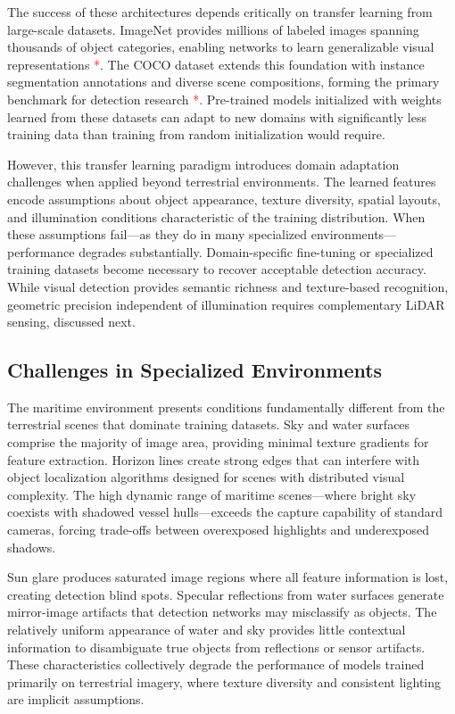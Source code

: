 \documentclass[../main.tex]{subfiles}
\begin{document}
The success of these architectures depends critically on transfer learning from large-scale datasets. ImageNet provides millions of labeled images spanning thousands of object categories, enabling networks to learn generalizable visual representations \textcolor{red}{*}. The COCO dataset extends this foundation with instance segmentation annotations and diverse scene compositions, forming the primary benchmark for detection research \textcolor{red}{*}. Pre-trained models initialized with weights learned from these datasets can adapt to new domains with significantly less training data than training from random initialization would require.

However, this transfer learning paradigm introduces domain adaptation challenges when applied beyond terrestrial environments. The learned features encode assumptions about object appearance, texture diversity, spatial layouts, and illumination conditions characteristic of the training distribution. When these assumptions fail—as they do in many specialized environments—performance degrades substantially. Domain-specific fine-tuning or specialized training datasets become necessary to recover acceptable detection accuracy. While visual detection provides semantic richness and texture-based recognition, geometric precision independent of illumination requires complementary LiDAR sensing, discussed next.

\subsection{Challenges in Specialized Environments}

The maritime environment presents conditions fundamentally different from the terrestrial scenes that dominate training datasets. Sky and water surfaces comprise the majority of image area, providing minimal texture gradients for feature extraction. Horizon lines create strong edges that can interfere with object localization algorithms designed for scenes with distributed visual complexity. The high dynamic range of maritime scenes—where bright sky coexists with shadowed vessel hulls—exceeds the capture capability of standard cameras, forcing trade-offs between overexposed highlights and underexposed shadows.

Sun glare produces saturated image regions where all feature information is lost, creating detection blind spots. Specular reflections from water surfaces generate mirror-image artifacts that detection networks may misclassify as objects. The relatively uniform appearance of water and sky provides little contextual information to disambiguate true objects from reflections or sensor artifacts. These characteristics collectively degrade the performance of models trained primarily on terrestrial imagery, where texture diversity and consistent lighting are implicit assumptions.
\end{document}

